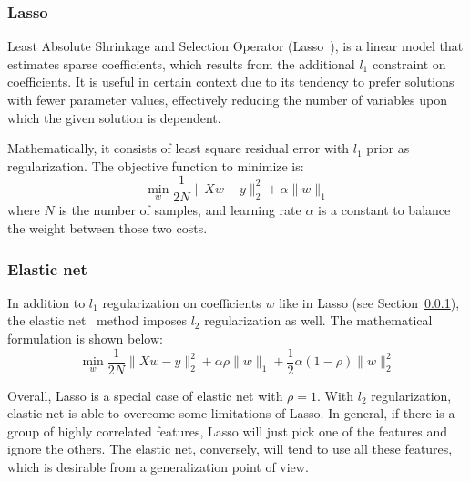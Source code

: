 \subsubsection{Lasso}
\label{ssub:lasso}
Least Absolute Shrinkage and Selection Operator (Lasso~\cite{Tibshirani1996}),
is a linear model that estimates sparse coefficients, which results from the
additional $l_1$ constraint on coefficients. It is useful in certain context
due to its tendency to prefer solutions with fewer parameter values,
effectively reducing the number of variables upon which the given solution is
dependent.

Mathematically, it consists of least square residual error with $l_1$ prior as
regularization. The objective function to minimize is:
\begin{equation}
  \min_w\frac{1}{2N}\|Xw - y\|^2_2 + \alpha\|w\|_1
\end{equation}
where $N$ is the number of samples, and learning rate $\alpha$ is a constant to
balance the weight between those two costs.

\subsubsection{Elastic net}
\label{ssub:elastic_net}
In addition to $l_1$ regularization on coefficients $w$ like in Lasso (see
Section~\ref{ssub:lasso}), the elastic net~\cite{zou2005} method imposes $l_2$
regularization as well. The mathematical formulation is shown below:
\begin{equation}
  \min_w\frac{1}{2N}\|Xw - y\|^2_2 + \alpha\rho\|w\|_1 + \frac{1}{2}\alpha(1-\rho)\|w\|^2_2
\end{equation}

Overall, Lasso is a special case of elastic net with $\rho = 1$.
With $l_2$ regularization, elastic net is able to overcome some limitations of
Lasso\@. In general, if there is a group of highly correlated features, Lasso
will just pick one of the features and ignore the others. The elastic net,
conversely, will tend to use all these features, which is desirable from a
generalization point of view.

